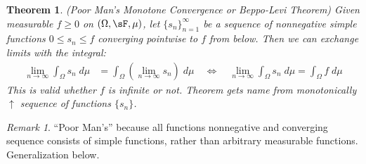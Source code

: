 \documentclass[12pt]{article}
\theoremstyle{plain}
\newtheorem{thm}{Theorem}[section]
\theoremstyle{definition}
\theoremstyle{remark}
\newtheorem*{rmk}{Remark}
\newcommand{\ninf}{_{n=1}^\infty}
\begin{document}
\begin{thm}\emph{(Poor Man's Monotone Convergence or Beppo-Levi Theorem)}
\label{thm:mctpoor}
Given measurable $f\geq 0$ on $(\Omega,\sF,\mu)$,
let $\{s_n\}\ninf$ be a sequence of nonnegative \emph{simple} functions
$0\leq s_n\leq f$ converging pointwise to $f$ from below.
Then we can exchange limits with the integral:
\begin{align*}
    \lim_{n\rightarrow\infty} \int_\Omega s_n \; d\mu &=
    \int_\Omega \left(\lim_{n\rightarrow\infty} s_n\right) \; d\mu
    \quad\iff\quad
    \lim_{n\rightarrow\infty} \int_\Omega s_n \; d\mu =
    \int_\Omega f \; d\mu
\end{align*}
This is valid whether $f$ is infinite or not.
Theorem gets name from monotonically $\uparrow$ sequence of
functions $\{s_n\}$.
\end{thm}
\begin{rmk}
``Poor Man's'' because all functions nonnegative and converging sequence
consists of simple functions, rather than arbitrary measurable
functions. Generalization below.
\end{rmk}
\end{document}
